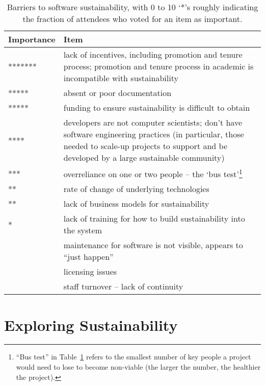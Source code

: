 \documentclass[11pt, oneside]{amsart}
\newcommand{\todo}[1]{{\color{blue}$\blacksquare$~\textsf{[TODO: #1]}}}
\begin{document}
\begin{table}[ht]
\caption{Barriers to software sustainability, with 0 to 10 `*'s roughly
indicating the fraction of attendees who voted for an item as important.}
\label{tb:software_sustainability_barriers}
 \centering
  \begin{scriptsize}
  \begin{tabular}{ | p{1.65cm} | p{10.0cm} |}
   \hline
  Importance & Item \\ \hline \hline
******* & lack of incentives, including promotion and tenure process; promotion
and tenure process in academic is incompatible with sustainability \\ \hline
*****  & absent or poor documentation \\ \hline
***** & funding to ensure sustainability is difficult to obtain \\ \hline
**** & developers are not computer scientists; don't have software engineering
practices (in particular, those needed to scale-up projects to support and be
developed by a large sustainable community) \\ \hline
*** & overreliance on one or two people -- the `bus test'\footnote{``Bus test''
in Table~\ref{tb:software_sustainability_barriers} refers to the smallest number
of key people a project would need to lose to become non-viable (the larger the
number, the healthier the project).} \\ \hline
** & rate of change of underlying technologies \\ \hline
** & lack of business models for sustainability \\ \hline
* & lack of training for how to build sustainability into the system \\ \hline
 & maintenance for software is not visible, appears to ``just happen'' \\ \hline
 & licensing issues \\ \hline
 & staff turnover -- lack of continuity \\ \hline
\end{tabular}
 \end{scriptsize}
\end{table}

\section{Exploring Sustainability} \label{sec:exploring}
\end{document}
